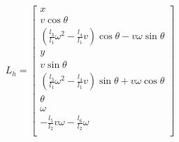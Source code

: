 \documentclass[letterpaper, 10 pt, conference]{ieeeconf}  %
\begin{document}
\begin{eqnarray}
L_h =
\left[\begin{array}{c}
x\\
v\cos\theta\\
\left(\frac{l_3}{l_1}\omega^2 - \frac{l_4}{l_1}v\right)\cos\theta - v\omega\sin\theta\\
y\\
v\sin\theta\\
\left(\frac{l_3}{l_1}\omega^2 - \frac{l_4}{l_1}v\right)\sin\theta + v\omega\cos\theta\\
\theta\\
\omega\\
-\frac{l_5}{l_2}v\omega - \frac{l_6}{l_2}\omega\\
\end{array}\right]
\end{eqnarray}




\end{document}
